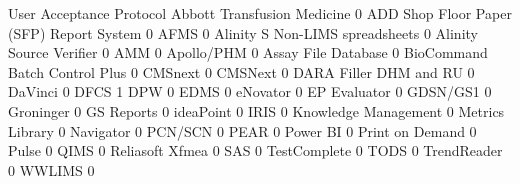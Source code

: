 \documentclass{article}
\begin{document}
\begin{Schunk}
\begin{Soutput}
                                           User Acceptance Protocol
  Abbott Transfusion Medicine                                     0
  ADD Shop Floor Paper (SFP) Report System                        0
  AFMS                                                            0
  Alinity S Non-LIMS spreadsheets                                 0
  Alinity Source Verifier                                         0
  AMM                                                             0
  Apollo/PHM                                                      0
  Assay File Database                                             0
  BioCommand Batch Control Plus                                   0
  CMSnext                                                         0
  CMSNext                                                         0
  DARA Filler DHM and RU                                          0
  DaVinci                                                         0
  DFCS                                                            1
  DPW                                                             0
  EDMS                                                            0
  eNovator                                                        0
  EP Evaluator                                                    0
  GDSN/GS1                                                        0
  Groninger                                                       0
  GS Reports                                                      0
  ideaPoint                                                       0
  IRIS                                                            0
  Knowledge Management                                            0
  Metrics Library                                                 0
  Navigator                                                       0
  PCN/SCN                                                         0
  PEAR                                                            0
  Power BI                                                        0
  Print on Demand                                                 0
  Pulse                                                           0
  QIMS                                                            0
  Reliasoft Xfmea                                                 0
  SAS                                                             0
  TestComplete                                                    0
  TODS                                                            0
  TrendReader                                                     0
  WWLIMS                                                          0


\end{Soutput}
\end{Schunk}
\end{document}
